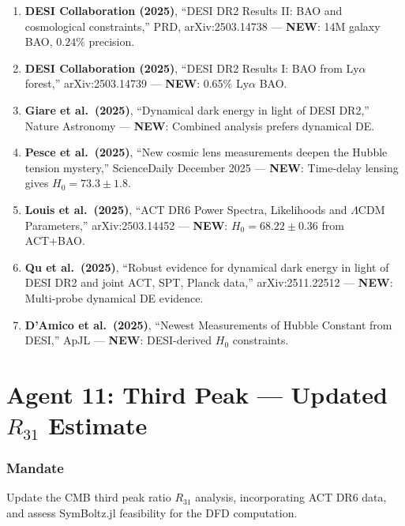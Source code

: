 \documentclass[11pt,a4paper]{article}
\newcommand{\NEW}{\textcolor{dfdblue}{\textbf{NEW}}}
\begin{document}
\begin{enumerate}
\item \textbf{DESI Collaboration (2025)}, ``DESI DR2 Results II: BAO and cosmological constraints,'' PRD, arXiv:2503.14738 --- \NEW: 14M galaxy BAO, $0.24\%$ precision.

\item \textbf{DESI Collaboration (2025)}, ``DESI DR2 Results I: BAO from Ly$\alpha$ forest,'' arXiv:2503.14739 --- \NEW: 0.65\% Ly$\alpha$ BAO.

\item \textbf{Giare et al.\ (2025)}, ``Dynamical dark energy in light of DESI DR2,'' Nature Astronomy --- \NEW: Combined analysis prefers dynamical DE.

\item \textbf{Pesce et al.\ (2025)}, ``New cosmic lens measurements deepen the Hubble tension mystery,'' ScienceDaily December 2025 --- \NEW: Time-delay lensing gives $H_0 = 73.3 \pm 1.8$.

\item \textbf{Louis et al.\ (2025)}, ``ACT DR6 Power Spectra, Likelihoods and $\Lambda$CDM Parameters,'' arXiv:2503.14452 --- \NEW: $H_0 = 68.22 \pm 0.36$ from ACT+BAO.

\item \textbf{Qu et al.\ (2025)}, ``Robust evidence for dynamical dark energy in light of DESI DR2 and joint ACT, SPT, Planck data,'' arXiv:2511.22512 --- \NEW: Multi-probe dynamical DE evidence.

\item \textbf{D'Amico et al.\ (2025)}, ``Newest Measurements of Hubble Constant from DESI,'' ApJL --- \NEW: DESI-derived $H_0$ constraints.
\end{enumerate}


\part{Agent 11: Third Peak --- Updated $R_{31}$ Estimate}
\label{part:agent11}

\section{Mandate}

Update the CMB third peak ratio $R_{31}$ analysis, incorporating ACT DR6 data, and assess SymBoltz.jl feasibility for the DFD computation.
\end{document}

